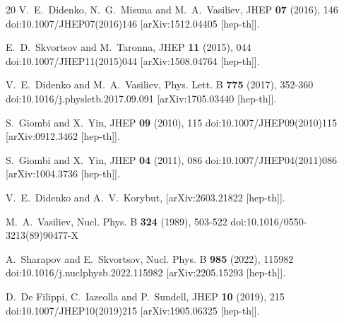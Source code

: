 \documentclass[12pt]{article}
\begin{document}
\begin{thebibliography}{20}
V.~E.~Didenko, N.~G.~Misuna and M.~A.~Vasiliev,
JHEP \textbf{07} (2016), 146
doi:10.1007/JHEP07(2016)146
[arXiv:1512.04405 [hep-th]].

E.~D.~Skvortsov and M.~Taronna,
JHEP \textbf{11} (2015), 044
doi:10.1007/JHEP11(2015)044
[arXiv:1508.04764 [hep-th]].

V.~E.~Didenko and M.~A.~Vasiliev,
Phys. Lett. B \textbf{775} (2017), 352-360
doi:10.1016/j.physletb.2017.09.091
[arXiv:1705.03440 [hep-th]].

S.~Giombi and X.~Yin,
JHEP \textbf{09} (2010), 115
doi:10.1007/JHEP09(2010)115
[arXiv:0912.3462 [hep-th]].

S.~Giombi and X.~Yin,
JHEP \textbf{04} (2011), 086
doi:10.1007/JHEP04(2011)086
[arXiv:1004.3736 [hep-th]].

V.~E.~Didenko and A.~V.~Korybut,
[arXiv:2603.21822 [hep-th]].

M.~A.~Vasiliev,
Nucl. Phys. B \textbf{324} (1989), 503-522
doi:10.1016/0550-3213(89)90477-X

A.~Sharapov and E.~Skvortsov,
Nucl. Phys. B \textbf{985} (2022), 115982
doi:10.1016/j.nuclphysb.2022.115982
[arXiv:2205.15293 [hep-th]].

D.~De Filippi, C.~Iazeolla and P.~Sundell,
JHEP \textbf{10} (2019), 215
doi:10.1007/JHEP10(2019)215
[arXiv:1905.06325 [hep-th]].


\end{thebibliography}
\end{document}

